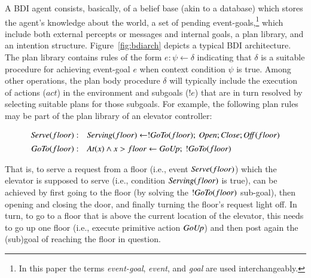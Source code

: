 
A BDI agent consists, basically, of a belief base (akin to a database) which
stores the agent's knowledge about the world, a set of pending
event-goals,\footnote{In this paper the terms {\em event-goal}, {\em event}, and
{\em goal} are used interchangeably.} which include both external percepts or
messages and internal goals, a plan library, and an intention structure.
Figure~\ref{fig:bdiarch} depicts a typical BDI architecture.
The plan library contains rules of the form $e: \psi \leftarrow \delta$
indicating that $\delta$ is a suitable procedure for achieving event-goal $e$
when context condition $\psi$ is true.
Among other operations, the plan body procedure $\delta$ will typically include
the execution of actions ($act$) in the environment and subgoals ($!e$) that are
in turn resolved by selecting suitable plans for those subgoals.
For example, the following plan rules may be part of the plan library of an
elevator controller:

\[
\begin{array}{rl}
\mbox{\textit{Serve}}(floor)  : &  \mbox{\textit{Serving}}(floor) \leftarrow 
	!\mbox{\textit{GoTo}}(floor);\ \mbox{\textit{Open}}; \mbox{\textit{Close}}; \mbox{\textit{Off}}(floor) \\[1ex] 
\mbox{\textit{GoTo}}(floor)  : & \mbox{\textit{At}}(x) \land x>floor \leftarrow \mbox{\textit{GoUp}};\ !\mbox{\textit{GoTo}}(floor)
\end{array}
\]

That is, to serve a request from a floor (i.e., event $\mbox{\textit{Serve}}(floor)$)
which the elevator is supposed to serve (i.e., condition $\mbox{\textit{Serving}}(floor)$ is
true), can be achieved by first going to the floor (by solving the
$!\mbox{\textit{GoTo}}(floor)$ sub-goal), then opening and closing the door, and finally
turning the floor's request light off.
In turn, to go to a floor that is above the current location of the elevator,
this needs to go up one floor (i.e., execute primitive action $\mbox{\textit{GoUp}}$) and then
post again the (sub)goal of reaching the floor in question.





